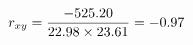\documentclass[preview]{standalone}
\begin{document}
\begin{align*}
\special{dvisvgm:raw <g id='unique000'>}r_{xy} = \frac{-525.20}{22.98 \times 23.61} = -0.97\special{dvisvgm:raw </g>}
\end{align*}
\end{document}
